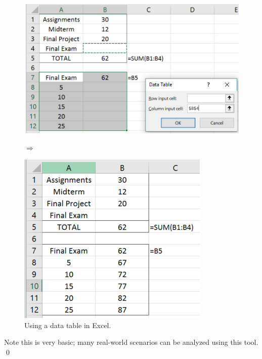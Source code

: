 \begin{myexample}
\begin{figure}[htbp]
 \begin{minipage}{0.55\textwidth}
        \centering
	\includegraphics[width=\linewidth]{fig/2_data_table_exB.png}
    \end{minipage}
    \quad $\Rightarrow$ \quad
    \begin{minipage}{0.37\textwidth}
        \centering
	\includegraphics[width=\linewidth]{fig/2_data_table_exC.png}
    \end{minipage}	
    \caption{Using a data table in Excel. \label{fig:2_data_table_ex}}
\end{figure}

Note this is very basic; many real-world scenarios can be analyzed using this tool. \qed


\end{myexample}

